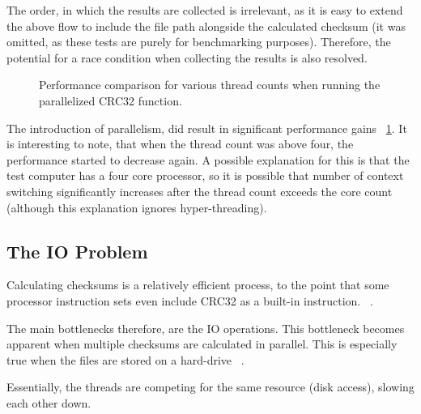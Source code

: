The order, in which the results are collected is irrelevant, as it is easy to extend the above flow to include
the file path alongside the calculated checksum (it was omitted, as these tests are purely for benchmarking purposes).
Therefore, the potential for a race condition when collecting the results is also resolved.

\begin{figure}[h]
    \centering
    \begin{bchart}[step=50,max=400, unit=s]
        \medskip
        \medskip
        \medskip
        \medskip
        \medskip
    \end{bchart}
    \caption{Performance comparison for various thread counts when running the parallelized CRC32 function.}
    \label{fig:checksum_fig_5}
\end{figure}


The introduction of parallelism, did result in significant performance gains ~\ref{fig:checksum_fig_5}.
It is interesting to note, that when the thread count was above four, the performance started to decrease again.
A possible explanation for this is that the test computer has a four core processor, so it is possible that number of context
switching significantly increases after the thread count exceeds the core count (although this explanation
ignores hyper-threading).

\subsection{The IO Problem}
Calculating checksums is a relatively efficient process, to the point that
some processor instruction sets even include CRC32
as a built-in instruction. ~\cite{CRC32Instruction}.

The main bottlenecks therefore, are the IO operations.
This bottleneck becomes apparent when multiple checksums are calculated in parallel.
This is especially true when the files are stored on a hard-drive ~\cite{PiotrParallelDiskAccess}.

Essentially, the threads are competing for the same resource (disk access), slowing each other down.


